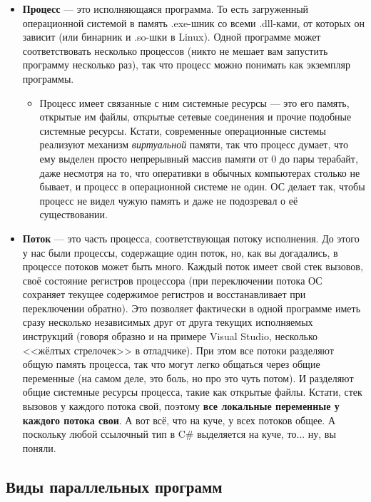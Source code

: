 \documentclass{../../text-style}
\begin{document}
\begin{itemize}
    \item \textbf{Процесс} --- это исполняющаяся программа. То есть загруженный операционной системой в память .exe-шник со всеми .dll-ками, от которых он зависит (или бинарник и .so-шки в Linux). Одной программе может соответствовать несколько процессов (никто не мешает вам запустить программу несколько раз), так что процесс можно понимать как экземпляр программы.
    \begin{itemize}
        \item Процесс имеет связанные с ним системные ресурсы --- это его память, открытые им файлы, открытые сетевые соединения и прочие подобные системные ресурсы. Кстати, современные операционные системы реализуют механизм \textit{виртуальной} памяти, так что процесс думает, что ему выделен просто непрерывный массив памяти от 0 до пары терабайт, даже несмотря на то, что оперативки в обычных компьютерах столько не бывает, и процесс в операционной системе не один. ОС делает так, чтобы процесс не видел чужую память и даже не подозревал о её существовании.
    \end{itemize}
    \item \textbf{Поток} --- это часть процесса, соответствующая потоку исполнения. До этого у нас были процессы, содержащие один поток, но, как вы догадались, в процессе потоков может быть много. Каждый поток имеет свой стек вызовов, своё состояние регистров процессора (при переключении потока ОС сохраняет текущее содержимое регистров и восстанавливает при переключении обратно). Это позволяет фактически в одной программе иметь сразу несколько независимых друг от друга текущих исполняемых инструкций (говоря образно и на примере Visual Studio, несколько <<жёлтых стрелочек>> в отладчике). При этом все потоки разделяют общую память процесса, так что могут легко общаться через общие переменные (на самом деле, это боль, но про это чуть потом). И разделяют общие системные ресурсы процесса, такие как открытые файлы. Кстати, стек вызовов у каждого потока свой, поэтому \textbf{все локальные переменные у каждого потока свои}. А вот всё, что на куче, у всех потоков общее. А поскольку любой ссылочный тип в C\# выделяется на куче, то... ну, вы поняли.
\end{itemize}

\subsection{Виды параллельных программ}
\end{document}
